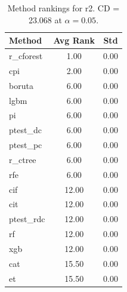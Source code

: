 \begin{table}[h]
\centering
\caption{Method rankings for r2. CD = 23.068 at $\alpha=0.05$.}
\label{tab:ranks_r2}
\begin{tabular}{lcc}
\toprule
Method & Avg Rank & Std \\
\midrule
r_cforest & 1.00 & 0.00 \\
cpi & 2.00 & 0.00 \\
boruta & 6.00 & 0.00 \\
lgbm & 6.00 & 0.00 \\
pi & 6.00 & 0.00 \\
ptest_dc & 6.00 & 0.00 \\
ptest_pc & 6.00 & 0.00 \\
r_ctree & 6.00 & 0.00 \\
rfe & 6.00 & 0.00 \\
cif & 12.00 & 0.00 \\
cit & 12.00 & 0.00 \\
ptest_rdc & 12.00 & 0.00 \\
rf & 12.00 & 0.00 \\
xgb & 12.00 & 0.00 \\
cat & 15.50 & 0.00 \\
et & 15.50 & 0.00 \\
\bottomrule
\end{tabular}
\end{table}